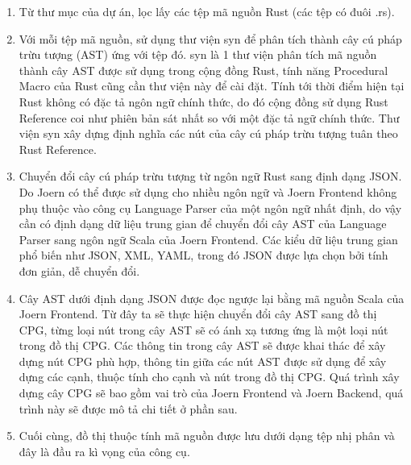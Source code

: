 \begin{enumerate}
	\item Từ thư mục của dự án, lọc lấy các tệp mã nguồn Rust (các tệp có đuôi .rs).
	\item Với mỗi tệp mã nguồn, sử dụng thư viện syn \cite{synRust} để phân tích thành cây cú pháp trừu tượng (AST) ứng với tệp đó. syn là 1 thư viện phân tích mã nguồn thành cây AST được sử dụng trong cộng đồng Rust, tính năng Procedural Macro \cite{rustlangProceduralMacros} của Rust cũng cần thư viện này để cài đặt. Tính tới thời điểm hiện tại Rust không có đặc tả ngôn ngữ chính thức, do đó cộng đồng sử dụng Rust Reference \cite{rustReference} coi như phiên bản sát nhất so với một đặc tả ngữ chính thức. Thư viện syn xây dựng định nghĩa các nút của cây cú pháp trừu tượng tuân theo Rust Reference.
	\item Chuyển đổi cây cú pháp trừu tượng từ ngôn ngữ Rust sang định dạng JSON.
	Do Joern có thể được sử dụng cho nhiều ngôn ngữ và Joern Frontend không phụ thuộc vào công cụ Language Parser của một ngôn ngữ nhất định, do vậy cần có định dạng dữ liệu trung gian để chuyển đổi cây AST của Language Parser sang ngôn ngữ Scala của Joern Frontend. Các kiểu dữ liệu trung gian phổ biến như JSON, XML, YAML, trong đó JSON được lựa chọn bởi tính đơn giản, dễ chuyển đổi.
	\item Cây AST dưới định dạng JSON được đọc ngược lại bằng mã nguồn Scala của Joern Frontend. Từ đây ta sẽ thực hiện chuyển đổi cây AST sang đồ thị CPG, từng loại nút trong cây AST sẽ có ánh xạ tương ứng là một loại nút trong đồ thị CPG. Các thông tin trong cây AST sẽ được khai thác để xây dựng nút CPG phù hợp, thông tin giữa các nút AST được sử dụng để xây dựng các cạnh, thuộc tính cho cạnh và nút trong đồ thị CPG. Quá trình xây dựng cây CPG sẽ bao gồm vai trò của Joern Frontend và Joern Backend, quá trình này sẽ được mô tả chi tiết ở phần sau.
	\item Cuối cùng, đồ thị thuộc tính mã nguồn được lưu dưới dạng tệp nhị phân và đây là đầu ra kì vọng của công cụ.
\end{enumerate}